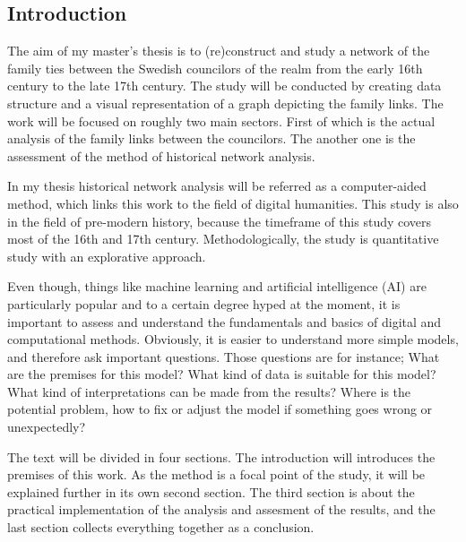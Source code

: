 \documentclass[a4paper,12pt]{article}
\begin{document}
\begin{onehalfspace} %
\section{Introduction}
The aim of my master's thesis is to (re)construct and study a network of the family ties between the Swedish councilors of the realm from the early 16th century to the late 17th century. The study will be conducted by creating data structure and a visual representation of a graph depicting the family links. The work will be focused on roughly two main sectors. First of which is the actual analysis of the family links between the councilors. The another one is the assessment of the method of historical network analysis. 

In my thesis historical network analysis will be referred as a computer-aided method, which links this work to the field of digital humanities. This study is also in the field of pre-modern history, because the timeframe of this study covers most of the 16th and 17th century. Methodologically, the study is quantitative study with an explorative approach.

Even though, things like machine learning and artificial intelligence (AI) are particularly popular and to a certain degree hyped at the moment, it is important to assess and understand the fundamentals and basics of digital and computational methods. Obviously, it is easier to understand more simple models, and therefore ask important questions. Those questions are for instance; What are the premises for this model? What kind of data is suitable for this model? What kind of interpretations can be made from the results? Where is the potential problem, how to fix or adjust the model if something goes wrong or unexpectedly?

The text will be divided in four sections. The introduction will introduces the premises of this work. As the method is a focal point of the study, it will be explained further in its own second section. The third section is about the practical implementation of the analysis and assesment of the results, and the last section collects everything together as a conclusion. 


\end{onehalfspace}
\end{document}
